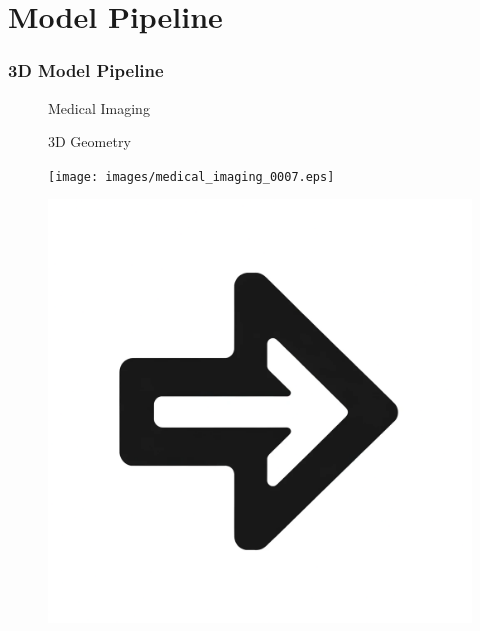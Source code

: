 \documentclass{beamer}
\begin{document}
\section{Model Pipeline}
\begin{frame}
	\frametitle{3D Model Pipeline}
	\vspace{-16pt}
	\begin{figure}[htbp]
		\begin{minipage}[t][0.06\paperheight][t]{\linewidth}
			\begin{minipage}{0.19\linewidth}
				\caption*{\tiny Medical Imaging}
			\end{minipage}
			\begin{minipage}{0.1\linewidth}
				\caption*{\tiny}
			\end{minipage}
			\begin{minipage}{0.19\linewidth}
				\caption*{\tiny 3D Geometry}
			\end{minipage}
			\begin{minipage}{0.1\linewidth}
				\caption*{\tiny}
			\end{minipage}
			\begin{minipage}{0.19\linewidth}
				\caption*{\tiny}
			\end{minipage}
			\begin{minipage}{0.1\linewidth}
				\caption*{\tiny}
			\end{minipage}
		\end{minipage}
		\begin{minipage}[c][0.35\paperheight][c]{\linewidth}
			\begin{minipage}{0.19\linewidth}
				\texttt{[image: images/medical\_imaging\_0007.eps]}
			\end{minipage}
			\begin{minipage}{0.1\linewidth}
				\includegraphics[width=\linewidth]{images/right_arrow.png}

\end{minipage}
\end{minipage}
\end{figure}
\end{frame}
\end{document}
